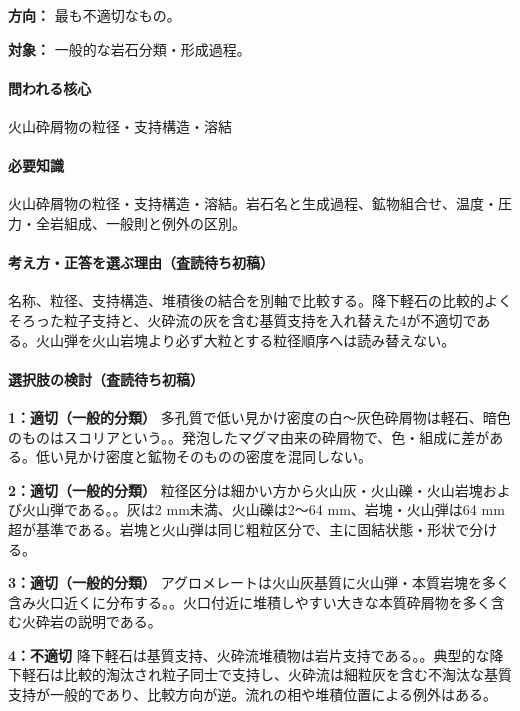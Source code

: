 \noindent\textbf{方向：} 最も不適切なもの。\par

\noindent\textbf{対象：} 一般的な岩石分類・形成過程。\par

\paragraph{問われる核心} 火山砕屑物の粒径・支持構造・溶結

\paragraph{必要知識} 火山砕屑物の粒径・支持構造・溶結。岩石名と生成過程、鉱物組合せ、温度・圧力・全岩組成、一般則と例外の区別。

\paragraph{考え方・正答を選ぶ理由（査読待ち初稿）} 名称、粒径、支持構造、堆積後の結合を別軸で比較する。降下軽石の比較的よくそろった粒子支持と、火砕流の灰を含む基質支持を入れ替えた4が不適切である。火山弾を火山岩塊より必ず大粒とする粒径順序へは読み替えない。

\paragraph{選択肢の検討（査読待ち初稿）}\mbox{}\par

\noindent\textbf{1：適切（一般的分類）} 多孔質で低い見かけ密度の白〜灰色砕屑物は軽石、暗色のものはスコリアという。。発泡したマグマ由来の砕屑物で、色・組成に差がある。低い見かけ密度と鉱物そのものの密度を混同しない。\par

\noindent\textbf{2：適切（一般的分類）} 粒径区分は細かい方から火山灰・火山礫・火山岩塊および火山弾である。。灰は2 mm未満、火山礫は2〜64 mm、岩塊・火山弾は64 mm超が基準である。岩塊と火山弾は同じ粗粒区分で、主に固結状態・形状で分ける。\par

\noindent\textbf{3：適切（一般的分類）} アグロメレートは火山灰基質に火山弾・本質岩塊を多く含み火口近くに分布する。。火口付近に堆積しやすい大きな本質砕屑物を多く含む火砕岩の説明である。\par

\noindent\textbf{4：不適切} 降下軽石は基質支持、火砕流堆積物は岩片支持である。。典型的な降下軽石は比較的淘汰され粒子同士で支持し、火砕流は細粒灰を含む不淘汰な基質支持が一般的であり、比較方向が逆。流れの相や堆積位置による例外はある。\par

